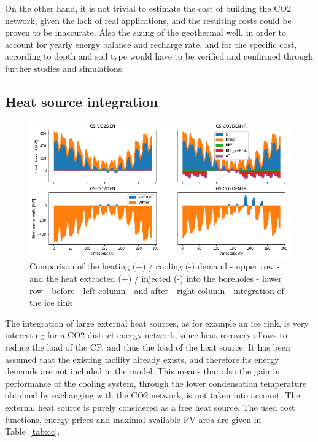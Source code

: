 \documentclass{article}
\begin{document}
On the other hand, it is not trivial to estimate the cost of building the CO2 network, given the lack of real applications, and the resulting costs could be proven to be inaccurate. Also the sizing of the geothermal well, in order to account for yearly energy balance and recharge rate, and for the specific cost, according to depth and soil type would have to be verified and confirmed through further studies and simulations.


\subsection{Heat source integration}

\begin{figure}[thpb]
	\centering
	\includegraphics[width=1\linewidth]{Images/V_IR_Q}
	\caption{Comparison of the heating (+) / cooling (-) demand - upper row - and the heat extracted (+) / injected (-) into the boreholes - lower row - before - left column - and after - right column - integration of the ice rink}
	\label{fig:V_IR_Q}
\end{figure}


The integration of large external heat sources, as for example an ice rink, is very interesting for a CO2 district energy network, since heat recovery allows to reduce the load of the CP, and thus the load of the heat source. It has been assumed that the existing facility already exists, and therefore its energy demands are not included in the model. This means that also the gain in performance of the cooling system, through the lower condensation temperature obtained by exchanging with the CO2 network, is not taken into account. The external heat source is purely considered as a free heat source. The used cost functions, energy prices and maximal available PV area are given in Table~\ref{tab:cc}. \\ 
\end{document}
